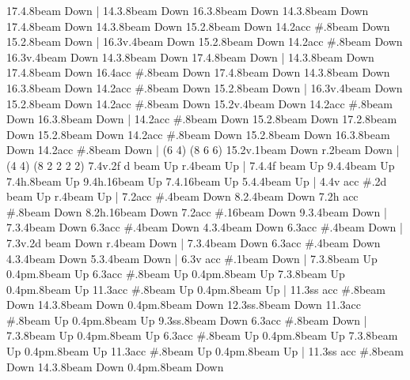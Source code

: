       17.4.8{beam Down}
    |
      14.3.8{beam Down}
      16.3.8{beam Down}
      14.3.8{beam Down}
      17.4.8{beam Down}
      14.3.8{beam Down}
      15.2.8{beam Down}
      14.2{acc #}.8{beam Down}
      15.2.8{beam Down}
    |
      16.3{v}.4{beam Down}
      15.2.8{beam Down}
      14.2{acc #}.8{beam Down}
      16.3{v}.4{beam Down}
      14.3.8{beam Down}
      17.4.8{beam Down}
    |
      14.3.8{beam Down}
      17.4.8{beam Down}
      16.4{acc #}.8{beam Down}
      17.4.8{beam Down}
      14.3.8{beam Down}
      16.3.8{beam Down}
      14.2{acc #}.8{beam Down}
      15.2.8{beam Down}
    |
      16.3{v}.4{beam Down}
      15.2.8{beam Down}
      14.2{acc #}.8{beam Down}
      15.2{v}.4{beam Down}
      14.2{acc #}.8{beam Down}
      16.3.8{beam Down}
    |
      14.2{acc #}.8{beam Down}
      15.2.8{beam Down}
      17.2.8{beam Down}
      15.2.8{beam Down}
      14.2{acc #}.8{beam Down}
      15.2.8{beam Down}
      16.3.8{beam Down}
      14.2{acc #}.8{beam Down}
    |
    \ts (6 4)
    \beaming (8 6 6)
      15.2{v}.1{beam Down}
      r.2{beam Down}
    |
    \ts (4 4)
    \beaming (8 2 2 2 2)
      7.4{v}.2{f d beam Up}
      r.4{beam Up}
    |
      7.4.4{f beam Up}
      9.4.4{beam Up}
      7.4{h}.8{beam Up}
      9.4{h}.16{beam Up}
      7.4.16{beam Up}
      5.4.4{beam Up}
    |
      4.4{v acc #}.2{d beam Up}
      r.4{beam Up}
    |
      7.2{acc #}.4{beam Down}
      8.2.4{beam Down}
      7.2{h acc #}.8{beam Down}
      8.2{h}.16{beam Down}
      7.2{acc #}.16{beam Down}
      9.3.4{beam Down}
    |
      7.3.4{beam Down}
      6.3{acc #}.4{beam Down}
      4.3.4{beam Down}
      6.3{acc #}.4{beam Down}
    |
      7.3{v}.2{d beam Down}
      r.4{beam Down}
    |
      7.3.4{beam Down}
      6.3{acc #}.4{beam Down}
      4.3.4{beam Down}
      5.3.4{beam Down}
    |
      6.3{v acc #}.1{beam Down}
    |
      7.3.8{beam Up}
      0.4{pm}.8{beam Up}
      6.3{acc #}.8{beam Up}
      0.4{pm}.8{beam Up}
      7.3.8{beam Up}
      0.4{pm}.8{beam Up}
      11.3{acc #}.8{beam Up}
      0.4{pm}.8{beam Up}
    |
      11.3{ss acc #}.8{beam Down}
      14.3.8{beam Down}
      0.4{pm}.8{beam Down}
      12.3{ss}.8{beam Down}
      11.3{acc #}.8{beam Up}
      0.4{pm}.8{beam Up}
      9.3{ss}.8{beam Down}
      6.3{acc #}.8{beam Down}
    |
      7.3.8{beam Up}
      0.4{pm}.8{beam Up}
      6.3{acc #}.8{beam Up}
      0.4{pm}.8{beam Up}
      7.3.8{beam Up}
      0.4{pm}.8{beam Up}
      11.3{acc #}.8{beam Up}
      0.4{pm}.8{beam Up}
    |
      11.3{ss acc #}.8{beam Down}
      14.3.8{beam Down}
      0.4{pm}.8{beam Down}
